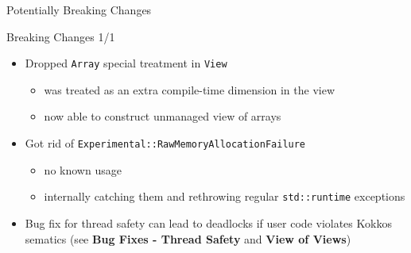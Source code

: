 
\begin{frame}[fragile]

  {\Huge Potentially Breaking Changes}
  
    \vspace{10pt}

\end{frame}


\begin{frame}[fragile]{Breaking Changes 1/1}

\begin{itemize}

\item Dropped \texttt{Array} special treatment in \texttt{View}
  \begin{itemize}
  \item was treated as an extra compile-time dimension in the view
  \item now able to construct unmanaged view of arrays
  \end{itemize}

\item Got rid of \texttt{Experimental::RawMemoryAllocationFailure}
  \begin{itemize}
  \item no known usage
  \item internally catching them and rethrowing regular \texttt{std::runtime} exceptions
  \end{itemize}

\item Bug fix for thread safety can lead to deadlocks if user code violates Kokkos sematics
      (see \textbf{Bug Fixes - Thread Safety} and \textbf{View of Views})

\end{itemize}

\end{frame}
